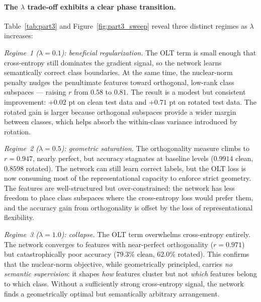 \documentclass[10pt]{article}
\begin{document}
\paragraph{The $\lambda$ trade-off exhibits a clear phase transition.}
Table~\ref{tab:part3} and Figure~\ref{fig:part3_sweep} reveal three
distinct regimes as $\lambda$ increases:

\emph{Regime~1 ($\lambda=0.1$): beneficial regularization.}
The OLT term is small enough that cross-entropy still dominates the
gradient signal, so the network learns semantically correct class
boundaries. At the same time, the nuclear-norm penalty nudges the
penultimate features toward orthogonal, low-rank class subspaces ---
raising $r$ from $0.58$ to $0.81$. The result is a modest but
consistent improvement: $+0.02$ pt on clean test data and $+0.71$ pt
on rotated test data. The rotated gain is larger because orthogonal
subspaces provide a wider margin between classes, which helps absorb
the within-class variance introduced by rotation.

\emph{Regime~2 ($\lambda=0.5$): geometric saturation.}
The orthogonality measure climbs to $r\!=\!0.947$, nearly perfect, but
accuracy stagnates at baseline levels ($0.9914$ clean, $0.8598$
rotated). The network can still learn correct labels, but the OLT loss
is now consuming most of the representational capacity to enforce
strict geometry. The features are well-structured but over-constrained:
the network has less freedom to place class subspaces where the
cross-entropy loss would prefer them, and the accuracy gain from
orthogonality is offset by the loss of representational flexibility.

\emph{Regime~3 ($\lambda=1.0$): collapse.}
The OLT term overwhelms cross-entropy entirely. The network converges
to features with near-perfect orthogonality ($r\!=\!0.971$) but
catastrophically poor accuracy ($79.3\%$ clean, $62.0\%$ rotated).
This confirms that the nuclear-norm objective, while geometrically
principled, carries \emph{no semantic supervision}: it shapes
\emph{how} features cluster but not \emph{which} features belong to
which class. Without a sufficiently strong cross-entropy signal, the
network finds a geometrically optimal but semantically arbitrary
arrangement.
\end{document}
